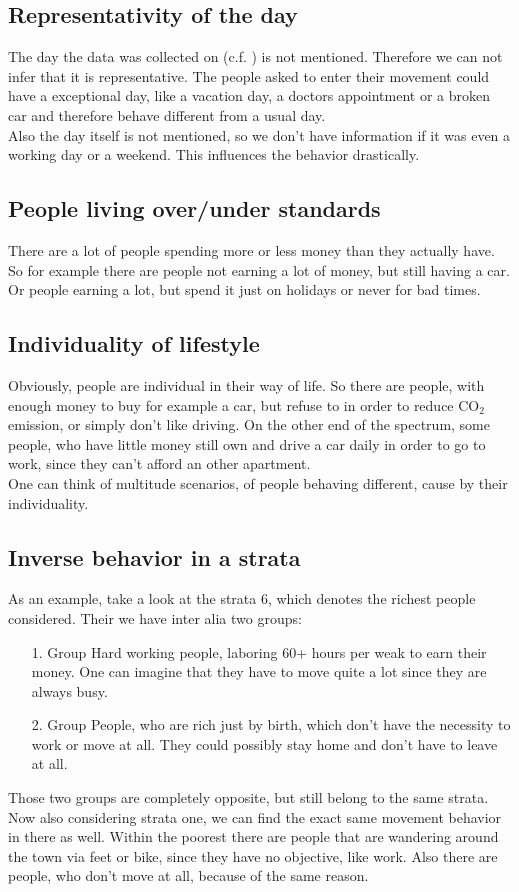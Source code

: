 \documentclass[runningheads]{llncs}
\begin{document}
	\subsection{Representativity of the day}
	The day the data was collected on (c.f. ) is not mentioned. Therefore we can not infer that it is representative. The people asked to enter their movement could have a exceptional day, like a vacation day, a doctors appointment or a broken car and therefore behave different from a usual day. \\
	Also the day itself is not mentioned, so we don't have information if it was even a working day or a weekend. This influences the behavior drastically.
	
	\subsection{People living over/under standards}
	There are a lot of people spending more or less money than they actually have. So for example there are people not earning a lot of money, but still having a car. Or people earning a lot, but spend it just on holidays or never for bad times.

	\subsection{Individuality of lifestyle}
	Obviously, people are individual in their way of life. So there are people, with enough money to buy for example a car, but refuse to in order to reduce CO$_2$ emission, or simply don't like driving. On the other end of the spectrum, some people, who have little money still own and drive a car daily in order to go to work, since they can't afford an other apartment.\\
	One can think of multitude scenarios, of people behaving different, cause by their individuality.
	
	\subsection{Inverse behavior in a strata}
	As an example, take a look at the strata 6, which denotes the richest people considered. Their we have inter alia two groups: 
	\begin{enumerate}
		\setlength{\itemindent}{1cm}
		\item[1. Group]
		Hard working people, laboring 60+ hours per weak to earn their money. One can imagine that they have to move quite a lot since they are always busy.
		\item[2. Group]
		People, who are rich just by birth, which don't have the necessity to work or move at all. They could possibly stay home and don't have to leave at all.
	\end{enumerate} 
	Those two groups are completely opposite, but still belong to the same strata. Now also considering strata one, we can find the exact same movement behavior in there as well. Within the poorest there are people that are wandering around the town via feet or bike, since they have no objective, like work. Also there are people, who don't move at all, because of the same reason.	
	
\end{document}
